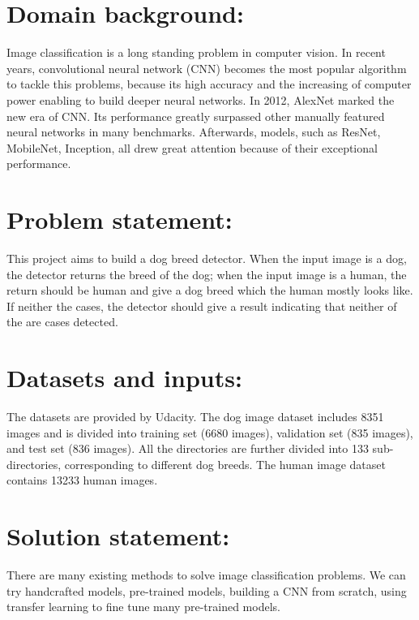 \documentclass{article}
\begin{document}
    \begin{normalsize}
    
    	\section{Domain background:}
        
        Image classification is a long standing problem in computer vision. In recent years, convolutional neural network (CNN) becomes the most popular algorithm to tackle this problems, because its high accuracy and the increasing of computer power enabling to build deeper neural networks. In 2012, AlexNet marked the new era of CNN. Its performance greatly surpassed other manually featured neural networks in many benchmarks. Afterwards, models, such as ResNet, MobileNet, Inception, all drew great attention because of their exceptional performance.

		\section{Problem statement:}
        
        This project aims to build a dog breed detector. When the input image is a dog, the detector returns the breed of the dog; when the input image is a human, the return should be human and give a dog breed which the human mostly looks like. If neither the cases, the detector should give a result indicating that neither of the are cases detected. 
        
	   	\section{Datasets and inputs:}
        
        The datasets are provided by Udacity. The dog image dataset includes 8351 images and is divided into training set (6680 images), validation set (835 images), and test set (836 images). All the directories are further divided into 133 sub-directories, corresponding to different dog breeds. The human image dataset contains 13233 human images.
        
    	\section{Solution statement:}
        
        There are many existing methods to solve image classification problems. We can try handcrafted models, pre-trained models, building a CNN from scratch, using transfer learning to fine tune many pre-trained models.
        

\end{normalsize}
\end{document}
